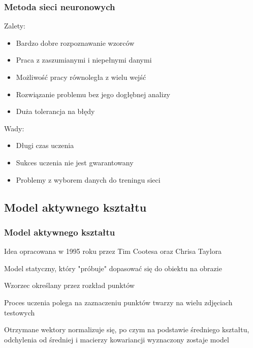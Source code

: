 \documentclass[xcolor=table]{beamer}
\begin{document}
\begin{frame}
  \frametitle{Metoda sieci neuronowych}

 { 
	Zalety:
	\begin{itemize}
		\item Bardzo dobre rozpoznawanie wzorców
		\item Praca z zaszumianymi i niepełnymi danymi
		\item Możliwość pracy równoległa z wielu wejść
		\item Rozwiązanie problemu bez jego dogłębnej analizy
		\item Duża tolerancja na błędy
	\end{itemize}
}

\vspace{10pt}
 {
	Wady:
	\begin{itemize}
	\item  Długi czas uczenia
	\item Sukces uczenia nie jest gwarantowany
	\item Problemy z wyborem danych do treningu sieci
	\end{itemize}
}
\end{frame}

\subsection{Model aktywnego kształtu}
\begin{frame}
  \frametitle{Model aktywnego kształtu}
  \begin{itemize}
   {\item Idea opracowana w 1995 roku przez Tim Cootesa oraz Chrisa Taylora}
   {\item Model statyczny, który "próbuje" dopasować się do obiektu na obrazie}
   {\item Wzorzec określany przez rozkład punktów}
   {\item Proces uczenia polega na zaznaczeniu punktów twarzy na wielu zdjęciach testowych}
   {\item Otrzymane wektory normalizuje się, po czym na podstawie średniego kształtu, odchylenia od średniej i macierzy kowariancji wyznaczony zostaje model}
 \end{itemize}
\end{frame}
\end{document}

